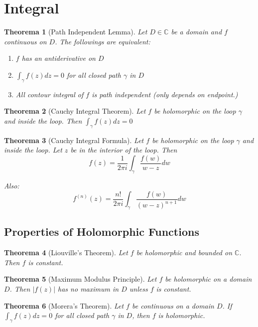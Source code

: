 \documentclass[12pt, a4paper]{article}
\newtheorem{theorem}{Theorema}[section]
\theoremstyle{definition}
\theoremstyle{remark}
\newcommand{\bb}[1]{\mathbb{#1}}
\begin{document}
\section{Integral}


\begin{theorem}[Path Independent Lemma] 
Let $D \in \bb{C}$ be a domain and $f$ continuous on $D$. The followings are equivalent:

\begin{enumerate}
	\item $f$ has an antiderivative on $D$
	\item $\int_{\gamma} f(z) dz = 0$ for all closed path $\gamma$ in $D$
	\item All contour integral of $f$ is path independent (only depends on endpoint.)
\end{enumerate}

\end{theorem}

\begin{theorem}[Cauchy Integral Theorem]
	Let $f$ be holomorphic on the loop $\gamma$ and inside the loop. Then $\int_{\gamma} f(z) dz = 0$
\end{theorem}

\begin{theorem}[Cauchy Integral Formula]
	Let $f$ be holomorphic on the loop $\gamma$ and inside the loop. Let $z$ be in the interior of the loop.
	Then 
	$$f(z) = \frac{1}{2\pi i} \int_{\gamma} \frac{f(w)}{w - z} dw$$

	Also: 
	\[
	f^{(n)}(z) = \frac{n!}{2\pi i} \int_{\gamma} \frac{f(w)}{(w - z)^{n+1}} dw	
		\]

\end{theorem}

\subsection{Properties of Holomorphic Functions}

\begin{theorem}[Liouville's Theorem]
	Let $f$ be holomorphic and bounded on $\bb{C}$. Then $f$ is constant.
\end{theorem}

\begin{theorem}[Maximum Modulus Principle]
	Let $f$ be holomorphic on a domain $D$. Then $|f(z)|$ has no maximum in $D$ unless $f$ is constant.
\end{theorem}


\begin{theorem}[Morera's Theorem]
	Let $f$ be continuous on a domain $D$. If $\int_{\gamma} f(z) dz = 0$ for all closed path $\gamma$ in $D$, then $f$ is holomorphic.
\end{theorem}
\end{document}
